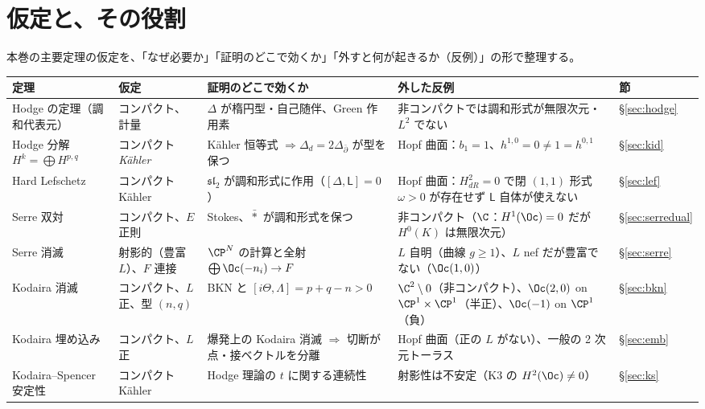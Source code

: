 \section{仮定と、その役割}\label{sec:assume}

本巻の主要定理の仮定を、「なぜ必要か」「証明のどこで効くか」「外すと何が起きるか（反例）」の形で整理する。

\begin{center}
\small
\renewcommand{\arraystretch}{1.25}
\begin{tabular}{p{}p{}p{}p{}p{}}
\toprule
定理 & 仮定 & 証明のどこで効くか & 外した反例 & 節\\\midrule
Hodge の定理（調和代表元） & コンパクト、計量 & $\Delta$ が楕円型・自己随伴、Green 作用素 & 非コンパクトでは調和形式が無限次元・$L^2$ でない & \S\ref{sec:hodge}\\
Hodge 分解 $H^k=\bigoplus H^{p,q}$ & コンパクト \emph{Kähler} & Kähler 恒等式 $\Rightarrow\Delta_d=2\Delta_{\bar\partial}$ が型を保つ & Hopf 曲面：$b_1=1$、$h^{1,0}=0\ne1=h^{0,1}$ & \S\ref{sec:kid}\\
Hard Lefschetz & コンパクト Kähler & $\mathfrak{sl}_2$ が調和形式に作用（$[\Delta,\mathsf L]=0$） & Hopf 曲面：$H^2_{dR}=0$ で閉 $(1,1)$ 形式 $\omega>0$ が存在せず $\mathsf L$ 自体が使えない & \S\ref{sec:lef}\\
Serre 双対 & コンパクト、$E$ 正則 & Stokes、$\bar\ast$ が調和形式を保つ & 非コンパクト（$\C$：$H^1(\Oc)=0$ だが $H^0(K)$ は無限次元） & \S\ref{sec:serredual}\\
Serre 消滅 & 射影的（豊富 $L$）、$F$ 連接 & $\CP^N$ の計算と全射 $\bigoplus\Oc(-n_i)\to F$ & $L$ 自明（曲線 $g\ge1$）、$L$ nef だが豊富でない（$\Oc(1,0)$） & \S\ref{sec:serre}\\
Kodaira 消滅 & コンパクト、$L$ 正、型 $(n,q)$ & BKN と $[i\Theta,\Lambda]=p+q-n>0$ & $\C^2\setminus0$（非コンパクト）、$\Oc(2,0)$ on $\CP^1\times\CP^1$（半正）、$\Oc(-1)$ on $\CP^1$（負）& \S\ref{sec:bkn}\\
Kodaira 埋め込み & コンパクト、$L$ 正 & 爆発上の Kodaira 消滅 $\Rightarrow$ 切断が点・接ベクトルを分離 & Hopf 曲面（正の $L$ がない）、一般の 2 次元トーラス & \S\ref{sec:emb}\\
Kodaira--Spencer 安定性 & コンパクト Kähler & Hodge 理論の $t$ に関する連続性 & 射影性は不安定（K3 の $H^2(\Oc)\ne0$） & \S\ref{sec:ks}\\\bottomrule
\end{tabular}
\end{center}

